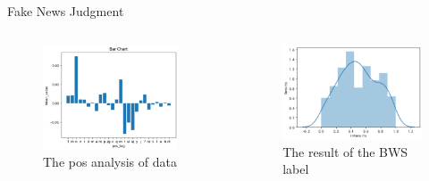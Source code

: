 \documentclass[10pt]{beamer}
\begin{document}
\begin{frame}{Fake News Judgment}
    \begin{columns}
        \begin{figure}
            \centering
            \includegraphics[width=0.9\textwidth]{pic/pos_analysis.png}
            \caption{The pos analysis of data}
            \label{fig:my_label}
        \end{figure}
        \begin{figure}
            \centering
            \includegraphics[width=\textwidth]{pic/bws_res.png}
            \caption{The result of the BWS label}
            \label{fig:my_label}
        \end{figure}
    \end{columns}
\end{frame}
\end{document}
